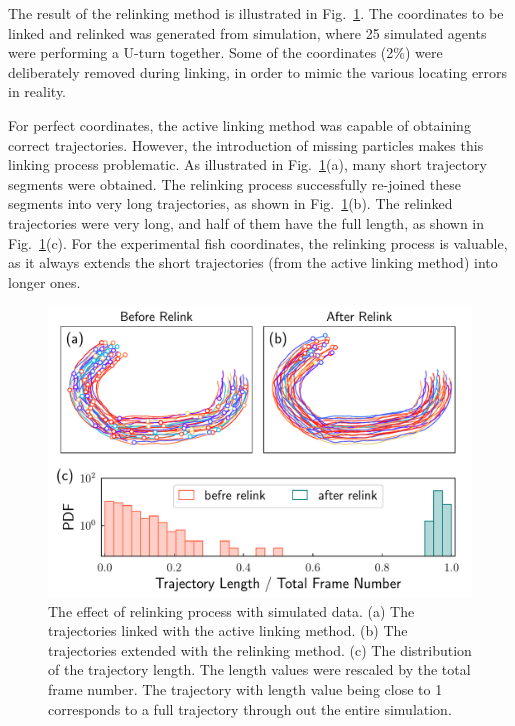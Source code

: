 \documentclass[11pt,twoside]{report}
\begin{document}
The result of the relinking method is illustrated in Fig.~\ref{fig:relink}. The coordinates to be linked and relinked was generated from simulation, where 25 simulated agents were performing a U-turn together. Some of the coordinates (2\%) were deliberately removed during linking, in order to mimic the various locating errors in reality. 

For perfect coordinates, the active linking method was capable of obtaining correct trajectories. However, the introduction of missing particles makes this linking process problematic. As illustrated in Fig.~\ref{fig:relink}(a), many short trajectory segments were obtained. The relinking process successfully re-joined these segments into very long trajectories, as shown in Fig.~\ref{fig:relink}(b). The relinked trajectories were very long, and half of them have the full length, as shown in Fig.~\ref{fig:relink}(c). For the experimental fish coordinates, the relinking process is valuable, as it always extends the short trajectories (from the active linking method) into longer ones.


\begin{figure}
  \includegraphics[width=\linewidth]{relink}
  \caption[The effect of relinking]{
  	The effect of relinking process with simulated data.
  	(a) The trajectories linked with the active linking method.
  	(b) The trajectories extended with the relinking method.
  	(c) The distribution of the trajectory length. The length values were rescaled by the total frame number. The trajectory with length value being close to 1 corresponds to a full trajectory through out the entire simulation.
  }
  \label{fig:relink}
\end{figure}
\end{document}
